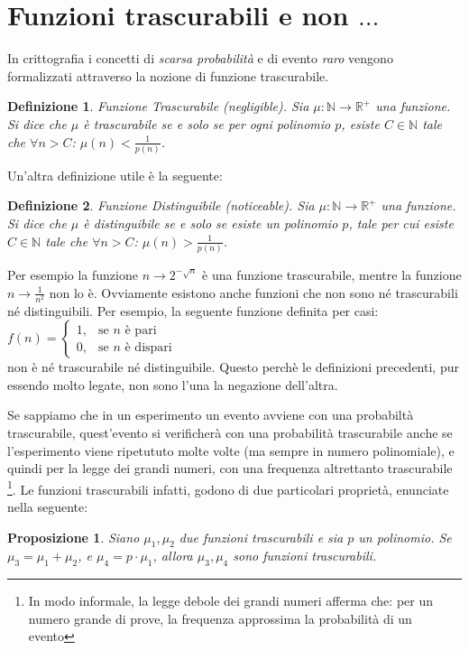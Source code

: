 \documentclass[a4paper,openright,twoside,12pt]{report}
\newtheorem{definizione}{Definizione}[chapter]
\newtheorem{proposizione}{Proposizione}[chapter]
\begin{document}
\section{Funzioni trascurabili e non $\dots$}
In crittografia i concetti di \emph{scarsa probabilit\`a} e di evento \emph{raro} vengono formalizzati attraverso la nozione di funzione trascurabile.
\begin{definizione}{Funzione Trascurabile (negligible).}
Sia $\mu: \mathbb{N} \rightarrow \mathbb{R^{+}}$ una funzione. Si dice che $\mu$ \`e trascurabile se e solo se per ogni polinomio $p$, esiste $C \in \mathbb{N} $ tale che $\forall n>C$: $\mu(n) < \frac{1}{p(n)}$.  
\end{definizione}
Un'altra definizione utile \`e la seguente:
\begin{definizione}{Funzione Distinguibile (noticeable).}
Sia $\mu: \mathbb{N} \rightarrow \mathbb{R^{+}}$ una funzione. Si dice che $\mu$ \`e distinguibile se e solo se esiste un polinomio $p$, tale per cui esiste $C \in \mathbb{N} $ tale che $\forall n>C$: $\mu(n) > \frac{1}{p(n)}$.  
\end{definizione}
Per esempio la funzione $n \rightarrow 2^{-\sqrt{n}}$ \`e una funzione trascurabile, mentre la funzione $n \rightarrow \frac{1}{n^2}$ non lo \`e. 
Ovviamente esistono anche funzioni che non sono n\'e trascurabili n\'e distinguibili. Per esempio, la seguente funzione definita per casi:
$f(n) = \begin{cases} 1, & \mbox{se } n\mbox{ \`e pari} \\ 0, & \mbox{se } n\mbox{ \`e dispari} \end{cases}$\\
non \`e n\'e trascurabile n\'e distinguibile. Questo perch\`e le definizioni precedenti, pur essendo molto legate, non sono l'una la negazione dell'altra.

Se sappiamo che in un esperimento un evento avviene con una probabilt\`a trascurabile,
quest'evento si verificher\`a con una probabilit\`a trascurabile anche se l'esperimento viene ripetututo molte volte (ma sempre in numero polinomiale), e quindi per la legge dei grandi numeri, 
con una frequenza altrettanto trascurabile
\footnote{In modo informale, la legge debole dei grandi numeri afferma che: per un numero grande di prove, 
la frequenza approssima la probabilit\`a di un evento}. 
Le funzioni trascurabili infatti, godono di due particolari propriet\`a, enunciate nella seguente:
\begin{proposizione}
Siano $\mu_1, \mu_2$ due funzioni trascurabili e sia $p$ un polinomio. Se $\mu_3 = \mu_1 + \mu_2$, e $\mu_4= p\cdot \mu_1$, allora $\mu_3, \mu_4$ sono funzioni trascurabili.  
\end{proposizione} 
\end{document}
